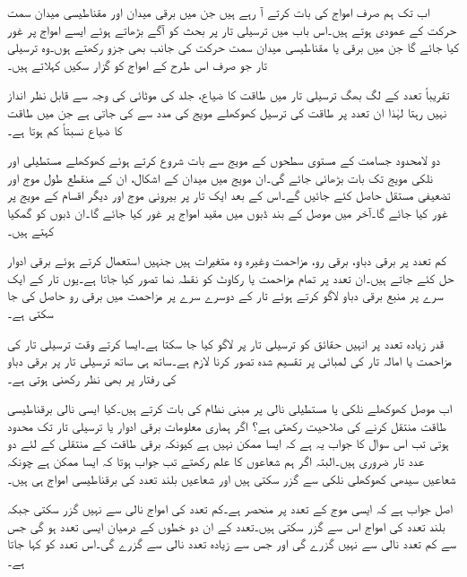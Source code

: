 اب تک ہم صرف    امواج کی بات کرتے آ رہے ہیں جن میں برقی  میدان اور مقناطیسی میدان سمت حرکت کے عمودی ہوتے ہیں۔اس باب میں ترسیلی تار پر بحث کو آگے بڑھاتے ہوئے ایسے امواج پر غور کیا جائے گا جن میں برقی یا مقناطیسی میدان سمت حرکت کی جانب بھی جزو رکھتے ہوں۔وہ ترسیلی تار جو صرف اس طرح کے امواج کو گزار سکیں  کہلاتے ہیں۔

تقریباً  تعدد کے لگ بھگ ترسیلی تار میں طاقت کا ضیاع، جلد کی موٹائی  کی وجہ سے قابل نظر انداز نہیں رہتا لہٰذا ان تعدد پر طاقت کی ترسیل کھوکھلے مویج کی مدد سے کی جاتی ہے جن میں طاقت کا ضیاع نسبتاً کم ہوتا ہے۔
  
دو لامحدود جسامت کے مستوی سطحوں کے مویج سے بات شروع کرتے ہوئے کھوکھلے مستطیلی اور نلکی مویج تک بات بڑھائی جائے گی۔ان مویج میں میدان کے اشکال، ان کے منقطع طول موج اور تضعیفی مستقل  حاصل کئے جائیں گے۔اس کے بعد ایک تار پر بیرونی موج  اور دیگر اقسام کے مویج پر غور کیا جائے گا۔آخر میں موصل کے بند ڈبوں میں مقید امواج پر غور کیا جائے گا۔ان ڈبوں کو گمکیا کہتے ہیں۔

کم تعدد پر برقی دباو، برقی رو، مزاحمت وغیرہ وہ متغیرات ہیں جنہیں استعمال کرتے ہوئے برقی ادوار حل کئے جاتے ہیں۔ان تعدد پر تمام مزاحمت یا رکاوٹ کو نقطہ نما تصور کیا جاتا ہے۔یوں تار کے ایک سرے پر منبع برقی دباو لاگو کرتے ہوئے تار کے دوسرے سرے پر مزاحمت میں برقی رو حاصل کی جا سکتی ہے۔

قدر زیادہ تعدد پر انہیں حقائق کو ترسیلی تار پر لاگو کیا جا سکتا ہے۔ایسا کرتے وقت ترسیلی تار کی مزاحمت یا امالہ تار کی لمبائی پر تقسیم شدہ  تصور کرنا لازم ہے۔ساتھ ہی ساتھ ترسیلی تار پر برقی دباو کی رفتار پر بھی نظر رکھنی ہوتی ہے۔

اب موصل کھوکھلے نلکی یا مستطیلی نالی پر مبنی نظام کی بات کرتے ہیں۔کیا ایسی نالی برقناطیسی طاقت منتقل کرنے کی صلاحیت رکھتی ہے؟ اگر ہماری معلومات برقی ادوار یا ترسیلی تار تک محدود ہوتی تب اس سوال کا جواب یہ ہے کہ ایسا ممکن نہیں ہے کیونکہ برقی طاقت کے منتقلی کے لئے دو عدد تار ضروری ہیں۔البتہ اگر ہم شعاعوں کا علم رکھتے تب جواب ہوتا کہ ایسا ممکن ہے چونکہ شعاعیں سیدھی کھوکھلی نلکی سے گزر سکتی ہیں اور شعاعیں بلند تعدد  کی برقناطیسی امواج ہی ہیں۔

اصل جواب ہے کہ ایسی موج کے تعدد پر منحصر ہے۔کم تعدد کی امواج نالی سے نہیں گزر سکتی جبکہ بلند تعدد کی امواج اس سے گزر سکتی ہیں۔تعدد کے ان دو خطوں کے درمیان ایسی تعدد ہو گی جس سے کم تعدد نالی سے نہیں گزرے گی اور جس سے زیادہ تعدد نالی سے گزرے گی۔اس تعدد کو  کہا جاتا ہے۔ 

